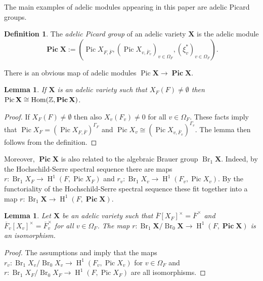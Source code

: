 \documentclass[a4paper,11pt,reqno]{amsart}
\DeclareMathOperator{\Hom}{Hom}
\DeclareMathOperator{\Pic}{Pic}
\DeclareMathOperator{\Br}{Br}
\DeclareMathOperator{\HH}{H}
\newtheorem{lemma}[theorem]{Lemma}
\theoremstyle{definition}
\newtheorem{definition}[theorem]{Definition}
\begin{document}
The main examples of adelic modules appearing in this paper are adelic Picard groups.
\begin{definition}
	The \emph{adelic Picard group} of an adelic variety $\mathbf{X}$ is the adelic module
	\begin{equation*}
		\bm{\Pic} \mathbf{X} := (\Pic X_{F,\overline{F}}, (\Pic X_{v, \overline{F}_v})_{v \in \Omega_F}, (\xi_v^*)_{v \in \Omega_F}).
	\end{equation*}
\end{definition}

There is an obvious map of adelic modules $\Pic \mathbf{X} \to \bm{\Pic} \mathbf{X}$.
\begin{lemma}\label{lem:global sections of adelic Pic are Pic}
	If $\mathbf{X}$ is an adelic variety such that $X_F(F) \neq \emptyset$ then $\Pic \mathbf{X} \cong \Hom(\Z, \bm{\Pic} \mathbf{X})$.
\end{lemma}
\begin{proof}
	If $X_F(F) \neq \emptyset$ then also $X_v(F_v) \neq 0$ for all $v \in \Omega_F$. These facts imply that $\Pic X_F = (\Pic X_{F, \overline{F}})^{\Gamma_F}$ and $\Pic X_v \cong (\Pic X_{v, \overline{F}_v})^{\Gamma_v}$. The lemma then follows from the definition.
\end{proof}

Moreover, $\bm{\Pic} \mathbf{X}$ is also related to the algebraic Brauer group $\Br_1 \mathbf{X}$. Indeed, by the Hochschild-Serre spectral sequence there are maps $r: \Br_1 X_F \to \HH^1(F, \Pic X_F)$ and $r_v: \Br_1 X_v \to \HH^1(F_v, \Pic X_v)$. By the functoriality of the Hochschild-Serre spectral sequence these fit together into a map $r: \Br_1 \mathbf{X} \to \HH^1(F, \bm{\Pic} \mathbf{X})$.
\begin{lemma}\label{lem:Br_1 is isomorphic to H^1(Pic) adelically}
	Let $\mathbf{X}$ be an adelic variety such that $\overline{F}[X_F]^{\times} = \overline{F}^{\times}$ and $\overline{F}_v[X_v]^{\times} = \overline{F}_v^{\times}$ for all $v \in \Omega_F$. The map $r: \Br_1 \mathbf{X}/\Br_ 0 \mathbf{X} \to \HH^1(F, \bm{\Pic} \mathbf{X})$ is an isomorphism.
\end{lemma}
\begin{proof}
	The assumptions and \cite[Cor. 2.3.9]{Skorogobatov2001Torsors} imply that the maps $r_v: \Br_1 X_v/ \Br_0 X_v\to \HH^1(F_v, \Pic X_v)$ for $v \in \Omega_{F}$ and $r: \Br_1 X_F /\Br_0 X_F \to \HH^1(F, \Pic X_F)$ are all isomorphisms. 
\end{proof}
\end{document}
